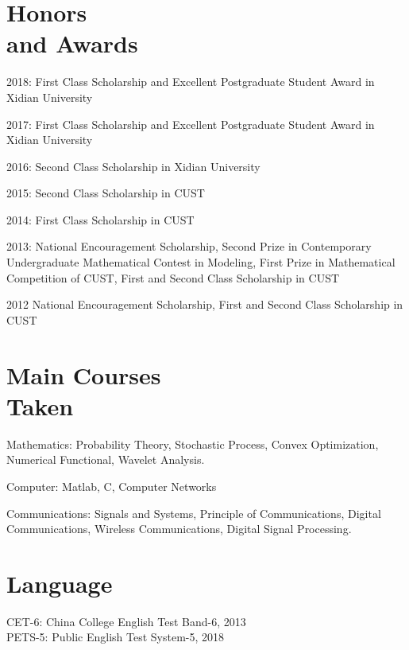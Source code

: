 \documentclass[margin,line]{resume}
\begin{document}
\begin{resume}
    \section{\mysidestyle Honors \\ and Awards}
    {\begin{list2}
    \item 2018: First Class Scholarship and Excellent Postgraduate Student Award in Xidian University
    \item 2017: First Class Scholarship and Excellent Postgraduate Student Award in Xidian University
    \item 2016: Second Class Scholarship in Xidian University
    \item 2015: Second Class Scholarship in CUST
    \item 2014: First Class Scholarship in CUST
    \item 2013: National Encouragement Scholarship, Second Prize in Contemporary Undergraduate Mathematical Contest in Modeling, First Prize in Mathematical Competition of CUST, First and Second Class Scholarship in CUST
    \item 2012 National Encouragement Scholarship, First and Second Class Scholarship in CUST
    \end{list2}}
    \vspace{-0mm}
    \section{\mysidestyle Main Courses\\Taken}
    \begin{list2}
        \item Mathematics: Probability Theory, Stochastic Process, Convex Optimization, Numerical Functional, Wavelet Analysis.
        \item Computer:  Matlab, C, Computer Networks
        \item Communications: Signals and Systems, Principle of Communications, Digital Communications, Wireless Communications, Digital Signal Processing.
    \end{list2}
    \vspace{-0mm}
      \section{\mysidestyle Language}
      CET-6: China College English Test Band-6, 2013 \\
      PETS-5: Public English Test System-5, 2018
      \vspace{-0mm}

\end{resume}
\end{document}
